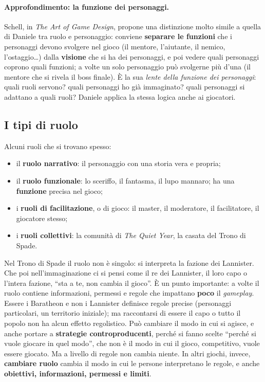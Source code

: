 \paragraph{Approfondimento: la funzione dei personaggi.} Schell, in \emph{The Art of Game
Design}, propone una distinzione molto simile a quella di Daniele tra ruolo e personaggio:
conviene \textbf{separare le funzioni} che i personaggi devono svolgere nel gioco (il mentore,
l'aiutante, il nemico, l'ostaggio\ldots) dalla \textbf{visione} che si ha dei personaggi, e poi
vedere quali personaggi coprono quali funzioni; a volte un solo personaggio può svolgerne più
d'una (il mentore che si rivela il boss finale). È la sua \emph{lente della funzione dei
personaggi}: quali ruoli servono? quali personaggi ho già immaginato? quali personaggi si
adattano a quali ruoli? Daniele applica la stessa logica anche ai giocatori.

\subsection{I tipi di ruolo}

Alcuni ruoli che si trovano spesso:
\begin{itemize}
  \item il \textbf{ruolo narrativo}: il personaggio con una storia vera e propria;
  \item il \textbf{ruolo funzionale}: lo sceriffo, il fantasma, il lupo mannaro; ha una
        \textbf{funzione} precisa nel gioco;
  \item i \textbf{ruoli di facilitazione}, o di gioco: il master, il moderatore, il
        facilitatore, il giocatore stesso;
  \item i \textbf{ruoli collettivi}: la comunità di \emph{The Quiet Year}, la casata del Trono di
        Spade.
\end{itemize}
Nel Trono di Spade il ruolo non è singolo: si interpreta la fazione dei Lannister. Che poi
nell'immaginazione ci si pensi come il re dei Lannister, il loro capo o l'intera fazione,
``sta a te, non cambia il gioco''. È un punto importante: a volte il ruolo contiene informazioni,
permessi e regole che impattano \textbf{poco} il \emph{gameplay}. Essere i Baratheon e non i
Lannister definisce regole precise (personaggi particolari, un territorio iniziale); ma
raccontarsi di essere il capo o tutto il popolo non ha alcun effetto regolistico. Può cambiare il
modo in cui si agisce, e anche portare a \textbf{strategie controproducenti}, perché si fanno
scelte ``perché si vuole giocare in quel modo'', che non è il modo in cui il gioco, competitivo,
vuole essere giocato. Ma a livello di regole non cambia niente. In altri giochi, invece,
\textbf{cambiare ruolo} cambia il modo in cui le persone interpretano le regole, e anche
\textbf{obiettivi, informazioni, permessi e limiti}.

